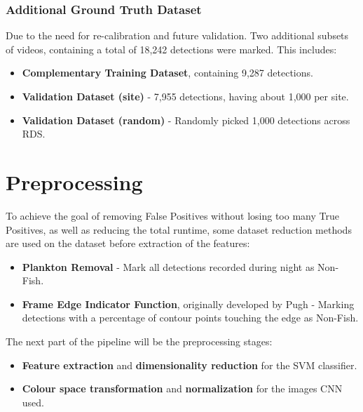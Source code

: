 \documentclass[bsc,frontabs,twoside,fullspacing,parskip,deptreport]{infthesis}
\begin{document}
\vspace{-10pt}

\subsection{Additional Ground Truth Dataset}
\label{sec:additionalgt}

Due to the need for re-calibration and future validation. 
Two additional subsets of videos, containing a total of 18,242 detections were marked.
This includes:

\begin{itemize}
\setlength{\parskip}{1pt}
\item
\textbf{Complementary Training Dataset}, containing 9,287 detections. 
\item
\textbf{Validation Dataset (site)} - 7,955 detections, having about 1,000 per site.
\item
\textbf{Validation Dataset (random)} - Randomly picked 1,000 detections across RDS.
\end{itemize}

\chapter{Preprocessing}
\label{chap:prepro}

To achieve the goal of removing False Positives without losing too many True Positives, as well as reducing the total runtime, some dataset reduction methods are used on the dataset before extraction of the features: 

\begin{itemize}
\setlength{\parskip}{1pt}
\item \textbf{Plankton Removal} - Mark all detections recorded during night as Non-Fish.
\item \textbf{Frame Edge Indicator Function}, originally developed by Pugh\cite{Pugh} - Marking detections with a percentage of contour points touching the edge as Non-Fish. 
\end{itemize}

The next part of the pipeline will be the preprocessing stages:

\begin{itemize}
\setlength{\parskip}{1pt}
\item \textbf{Feature extraction} and \textbf{dimensionality reduction} for the SVM classifier.
\item \textbf{Colour space transformation} and \textbf{normalization} for the images CNN used. 
\end{itemize}
\end{document}
